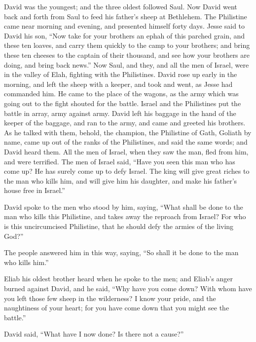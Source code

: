 {David was the youngest; and the three oldest followed Saul.
Now David went back and forth from Saul to feed his father’s sheep at Bethlehem.
The Philistine came near morning and evening, and presented himself forty days.
Jesse said to David his son, “Now take for your brothers an ephah
 of this parched grain, and these ten loaves, and carry them quickly to the camp to your brothers;
and bring these ten cheeses to the captain of their thousand, and see how your brothers are doing, and bring back news.”
Now Saul, and they, and all the men of Israel, were in the valley of Elah, fighting with the Philistines.
David rose up early in the morning, and left the sheep with a keeper, and took and went, as Jesse had commanded him. He came to the place of the wagons, as the army which was going out to the fight shouted for the battle.
Israel and the Philistines put the battle in array, army against army.
David left his baggage in the hand of the keeper of the baggage, and ran to the army, and came and greeted his brothers.
As he talked with them, behold, the champion, the Philistine of Gath, Goliath by name, came up out of the ranks of the Philistines, and said the same words; and David heard them.
All the men of Israel, when they saw the man, fled from him, and were terrified.
The men of Israel said, “Have you seen this man who has come up? He has surely come up to defy Israel. The king will give great riches to the man who kills him, and will give him his daughter, and make his father’s house free in Israel.”
\par }{\PP {}David spoke to the men who stood by him, saying, “What shall be done to the man who kills this Philistine, and takes away the reproach from Israel? For who is this uncircumcised Philistine, that he should defy the armies of the living God?”
\par }{\PP {}The people answered him in this way, saying, “So shall it be done to the man who kills him.”
\par }{\PP {}Eliab his oldest brother heard when he spoke to the men; and Eliab’s anger burned against David, and he said, “Why have you come down? With whom have you left those few sheep in the wilderness? I know your pride, and the naughtiness of your heart; for you have come down that you might see the battle.”
\par }{\PP {}David said, “What have I now done? Is there not a cause?”
}
